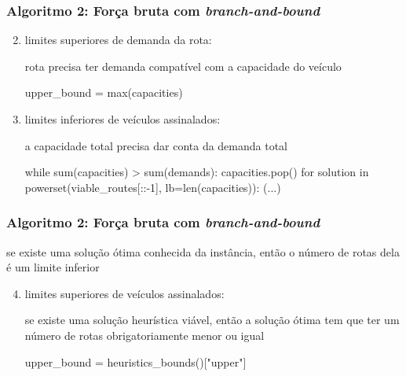 \documentclass{beamer}
\begin{document}




\begin{frame}[fragile] %
    \frametitle{Algoritmo 2: Força bruta com \emph{branch-and-bound}}

    \begin{enumerate}
        \setcounter{enumi}{1}
        \item limites superiores de demanda da rota:
    \begin{block}{rota precisa ter demanda compatível com a capacidade do veículo}
    \begin{python}
    upper_bound = max(capacities)
    \end{python}
    \end{block}

        \item limites inferiores de veículos assinalados:
    \begin{block}{a capacidade total precisa dar conta da demanda total}
    \begin{python}
    while sum(capacities) > sum(demands):
        capacities.pop()
    for solution in powerset(viable_routes[::-1],
                             lb=len(capacities)):
        (...)
    \end{python}
    \end{block}
        
    \end{enumerate}


\end{frame}


\begin{frame}[fragile] %
    \frametitle{Algoritmo 2: Força bruta com \emph{branch-and-bound}}

    \begin{block}{se existe uma solução ótima conhecida da instância, então o número de rotas dela é um limite inferior}
    
    \end{block}

    \begin{enumerate}
        \setcounter{enumi}{3}
        \item limites superiores de veículos assinalados:

    \begin{block}{se existe uma solução heurística viável, então a solução ótima tem que ter um número de rotas obrigatoriamente menor ou igual}
    \begin{python}
    upper_bound = heuristics_bounds()["upper"]
    \end{python}
    \end{block}
        
    \end{enumerate}

\end{frame}
\end{document}
